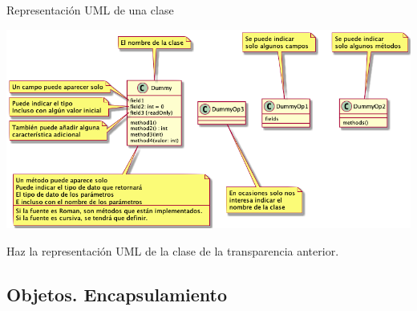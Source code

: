 \documentclass[10pt,envcountsect,spanish]{beamer}
\begin{document}
\begin{frame}{Representación UML de una clase}

\centerline{\includegraphics[width=1.05\textwidth]{fig/claseUML}}



\begin{ejercicio}{}
Haz la representación UML de la clase  de la transparencia anterior.
\end{ejercicio}


\end{frame}






\subsection{Objetos. Encapsulamiento}
\end{document}
